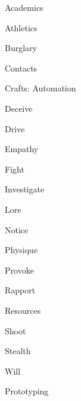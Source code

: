 \begin{npcBox}[title=Scriptit a Pioneer Automationator]

    \begin{aspects}
    \item {}
    \item {}
    \item \aspect[Aspect]{}
    \end{aspects}
    
    \begin{skills}
        \item {} Academics
        \item {} Athletics
        \item {} Burglary
        \item {} Contacts
        \item {} Crafts: Automation
        \item {} Deceive
        \item {} Drive
        \item {} Empathy
        \item {} Fight
        \item {} Investigate
        \item {} Lore
        \item {} Notice
        \item {} Physique
        \item {} Provoke
        \item {} Rapport
        \item {} Resources
        \item {} Shoot
        \item {} Stealth
        \item {} Will
        \item {} Prototyping
     \end{skills}
    
    \begin{stunts}
    \item {}
    \end{stunts}
    
    \begin{stressSection}
    \end{stressSection}
    \begin{tabularx}{\textwidth}{ XX }
    \end{tabularx}
    

\end{npcBox}
